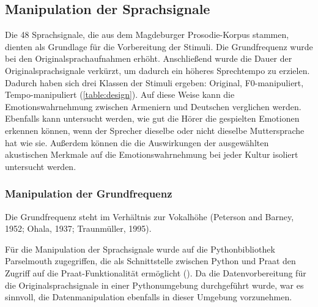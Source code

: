 \documentclass[11pt,a4paper,headsepline,twoside,toc=bibliography]{scrreprt}
\begin{document}
\subsection{Manipulation der Sprachsignale}

Die 48 Sprachsignale, die aus dem Magdeburger Prosodie-Korpus stammen, dienten als Grundlage für die Vorbereitung der Stimuli. Die Grundfrequenz wurde bei den Originalsprachaufnahmen erhöht. Anschließend wurde die Dauer der Originalsprachsignale verkürzt, um dadurch ein höheres Sprechtempo zu erzielen. Dadurch haben sich drei Klassen der Stimuli ergeben: Original, F0-manipuliert, Tempo-manipuliert (\autoref{table:design}). Auf diese Weise kann die Emotionswahrnehmung zwischen Armeniern und Deutschen verglichen werden. Ebenfalls kann untersucht werden, wie gut die Hörer die gespielten Emotionen erkennen können, wenn der Sprecher dieselbe oder nicht dieselbe Muttersprache hat wie sie. Außerdem können die die Auswirkungen der ausgewählten akustischen Merkmale auf die Emotionswahrnehmung bei jeder Kultur isoliert untersucht werden. 

\subsubsection{Manipulation der Grundfrequenz}
\label{sec:f0_manipulation}
Die Grundfrequenz steht im Verhältnis zur Vokalhöhe (Peterson and Barney, 1952; Ohala, 1937; Traunmüller, 1995).

Für die Manipulation der Sprachsignale wurde auf die Pythonbibliothek Parselmouth zugegriffen, die als
Schnittstelle zwischen Python und Praat den Zugriff auf die Praat-Funktionalität ermöglicht (\cite{Jadoul2018a}). Da die Datenvorbereitung für die Originalsprachsignale in einer Pythonumgebung durchgeführt wurde, war es sinnvoll, die Datenmanipulation ebenfalls in dieser Umgebung vorzunehmen.\\

\bigskip
\end{document}
